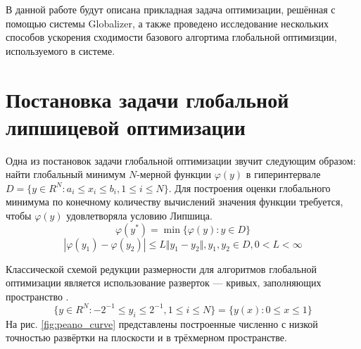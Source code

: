 В данной работе будут описана прикладная задача оптимизации, решённая с помощью системы
Globalizer, а также проведено исследование нескольких способов ускорения сходимости
базового алгортима глобальной оптимизции, используемого в системе.

\section{Постановка задачи глобальной липшицевой оптимизации}
Одна из постановок задачи глобальной оптимизации звучит следующим образом: найти
глобальный минимум \(N\)-мерной функции \(\varphi(y)\) в гиперинтервале
\(D=\{y\in R^N:a_i\leqslant x_i\leqslant{b_i}, 1\leqslant{i}\leqslant{N}\}\).
Для построения оценки глобального минимума по конечному количеству вычислений
значения функции требуется, чтобы \(\varphi(y)\) удовлетворяла условию Липшица.
\begin{displaymath}
\label{task}
\varphi(y^*)=\min\{\varphi(y):y\in D\}
\end{displaymath}
\begin{displaymath}
\label{lip}
|\varphi(y_1)-\varphi(y_2)|\leqslant L\Vert y_1-y_2\Vert,y_1,y_2\in D,0<L<\infty
\end{displaymath}

Классической схемой редукции размерности для алгоритмов глобальной оптимизации является
использование разверток --- кривых, заполняющих пространство \cite{strOptBook}.
\begin{displaymath}
\label{cube}
\lbrace y\in R^N:-2^{-1}\leqslant y_i\leqslant 2^{-1},1\leqslant i\leqslant N\rbrace=\{y(x):0\leqslant x\leqslant 1\}
\end{displaymath}
На рис. \ref{fig:peano_curve} представлены построенные численно с низкой точностью развёртки на плоскости и
в трёхмерном пространстве.

